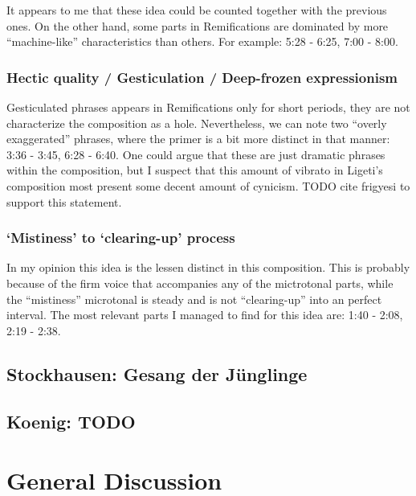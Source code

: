 \documentclass[a4paper,11pt]{article}
\begin{document}
It appears to me that these idea could be counted together with the previous ones.
On the other hand, some parts in Remifications are dominated by more ``machine-like'' characteristics than others.
For example: 5:28 - 6:25, 7:00 - 8:00.

\subsubsection{Hectic quality / Gesticulation / Deep-frozen expressionism}

Gesticulated phrases appears in Remifications only for short periods, they are not characterize the composition as a hole.
Nevertheless, we can note two ``overly exaggerated'' phrases, where the primer is a bit more distinct in that manner: 3:36 - 3:45, 6:28 - 6:40.
One could argue that these are just dramatic phrases within the composition, but I suspect that this amount of vibrato in Ligeti's composition most present some decent amount of cynicism.
TODO cite frigyesi to support this statement.

\subsubsection{‘Mistiness’ to ‘clearing-up’ process}

In my opinion this idea is the lessen distinct in this composition.
This is probably because of the firm voice that accompanies any of the mictrotonal parts, while the ``mistiness'' microtonal is steady and is not ``clearing-up'' into an perfect interval.
The most relevant parts I managed to find for this idea are: 1:40 - 2:08, 2:19 - 2:38.

\subsection{Stockhausen: Gesang der J{\"u}nglinge}
\label{sub:composition_stockhausen}

\subsection{Koenig: TODO}
\label{sub:composition_koenig}

\section{General Discussion}
\label{sec:general_discussion}

\printbibliography[title={Bibliography}]
\end{document}
